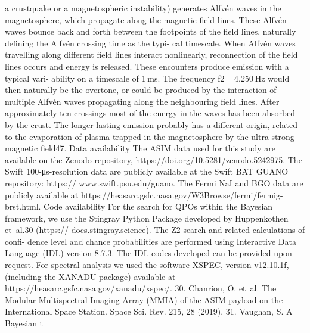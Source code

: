 a crustquake or a magnetospheric instability) generates Alfvén waves
in the magnetosphere, which propagate along the magnetic field lines.
These Alfvén waves bounce back and forth between the footpoints of
the field lines, naturally defining the Alfvén crossing time as the typi-
cal timescale. When Alfvén waves travelling along different field lines
interact nonlinearly, reconnection of the field lines occurs and energy
is released. These encounters produce emission with a typical vari-
ability on a timescale of 1 ms. The frequency f2 = 4,250 Hz would then
naturally be the overtone, or could be produced by the interaction of
multiple Alfvén waves propagating along the neighbouring field lines.
After approximately ten crossings most of the energy in the waves has
been absorbed by the crust. The longer-lasting emission probably has
a different origin, related to the evaporation of plasma trapped in the
magnetosphere by the ultra-strong magnetic field47.
Data availability
The ASIM data used for this study are available on the Zenodo repository,
https://doi.org/10.5281/zenodo.5242975. The Swift 100-μs-resolution
data are publicly available at the Swift BAT GUANO repository: https://
www.swift.psu.edu/guano. The Fermi NaI and BGO data are publicly
available at https://heasarc.gsfc.nasa.gov/W3Browse/fermi/fermig-
brst.html.
Code availability
For the search for QPOs within the Bayesian framework, we use the
Stingray Python Package developed by Huppenkothen et al.30 (https://
docs.stingray.science). The Z2 search and related calculations of confi-
dence level and chance probabilities are performed using Interactive
Data Language (IDL) version 8.7.3. The IDL codes developed can be
provided upon request. For spectral analysis we used the software
XSPEC, version v12.10.1f, (including the XANADU package) available
at https://heasarc.gsfc.nasa.gov/xanadu/xspec/.
30.	 Chanrion, O. et al. The Modular Multispectral Imaging Array (MMIA) of the ASIM payload
on the International Space Station. Space Sci. Rev. 215, 28 (2019).
31.
Vaughan, S. A Bayesian t

